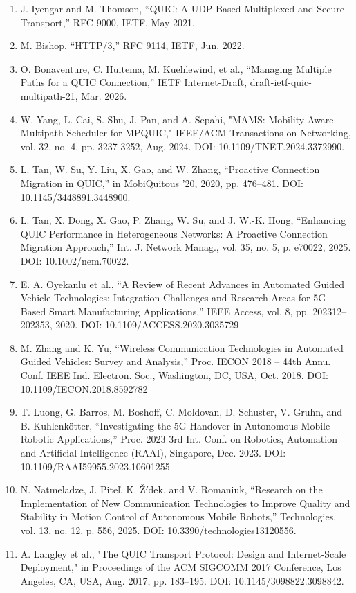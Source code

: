 \begin{enumerate}
\item
  J. Iyengar and M. Thomson, ``QUIC: A UDP-Based Multiplexed and Secure Transport,'' RFC 9000, IETF, May 2021.
\item
  M. Bishop, ``HTTP/3,'' RFC 9114, IETF, Jun. 2022.
\item
  O. Bonaventure, C. Huitema, M. Kuehlewind, et al., ``Managing Multiple Paths for a QUIC Connection,'' IETF Internet-Draft, draft-ietf-quic-multipath-21, Mar. 2026.
\item
  W. Yang, L. Cai, S. Shu, J. Pan, and A. Sepahi, "MAMS: Mobility-Aware Multipath Scheduler for MPQUIC," IEEE/ACM Transactions on Networking, vol. 32, no. 4, pp. 3237-3252, Aug. 2024. DOI: 10.1109/TNET.2024.3372990.
\item
  L. Tan, W. Su, Y. Liu, X. Gao, and W. Zhang, ``Proactive Connection Migration in QUIC,'' in MobiQuitous '20, 2020, pp. 476--481. DOI: 10.1145/3448891.3448900.
\item
  L. Tan, X. Dong, X. Gao, P. Zhang, W. Su, and J. W.-K. Hong, ``Enhancing QUIC Performance in Heterogeneous Networks: A Proactive Connection Migration Approach,'' Int. J. Network Manag., vol. 35, no. 5, p. e70022, 2025. DOI: 10.1002/nem.70022.
\item
  E. A. Oyekanlu et al., ``A Review of Recent Advances in Automated Guided Vehicle Technologies: Integration Challenges and Research Areas for 5G-Based Smart Manufacturing Applications,'' IEEE Access, vol. 8, pp. 202312--202353, 2020. DOI: 10.1109/ACCESS.2020.3035729
\item
  M. Zhang and K. Yu, ``Wireless Communication Technologies in Automated Guided Vehicles: Survey and Analysis,'' Proc. IECON 2018 -- 44th Annu. Conf. IEEE Ind. Electron. Soc., Washington, DC, USA, Oct. 2018. DOI: 10.1109/IECON.2018.8592782
\item
  T. Luong, G. Barros, M. Boshoff, C. Moldovan, D. Schuster, V. Gruhn, and B. Kuhlenkötter, ``Investigating the 5G Handover in Autonomous Mobile Robotic Applications,'' Proc. 2023 3rd Int. Conf. on Robotics, Automation and Artificial Intelligence (RAAI), Singapore, Dec. 2023. DOI: 10.1109/RAAI59955.2023.10601255
\item
  N. Natmeladze, J. Piteľ, K. Žídek, and V. Romaniuk, ``Research on the Implementation of New Communication Technologies to Improve Quality and Stability in Motion Control of Autonomous Mobile Robots,'' Technologies, vol. 13, no. 12, p. 556, 2025. DOI: 10.3390/technologies13120556.
\item
  A. Langley et al., "The QUIC Transport Protocol: Design and Internet-Scale Deployment," in Proceedings of the ACM SIGCOMM 2017 Conference, Los Angeles, CA, USA, Aug. 2017, pp. 183--195. DOI: 10.1145/3098822.3098842.

\end{enumerate}

